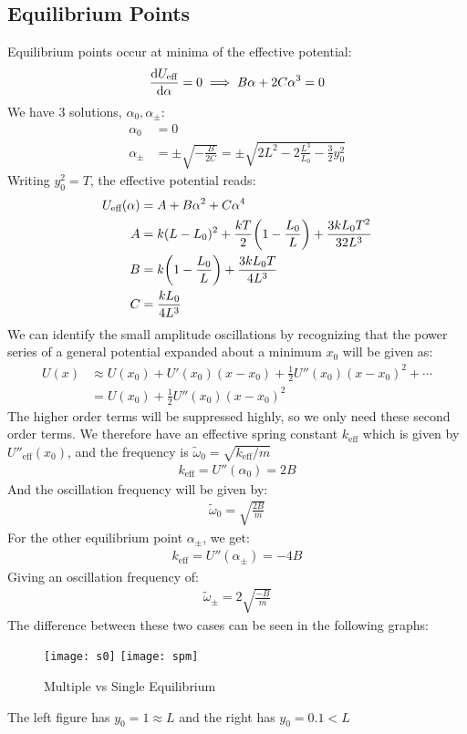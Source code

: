 \subsection{Equilibrium Points}
Equilibrium points occur at minima of the effective potential:
\begin{align*}
  \dv{U_{\text{eff}}}{\alpha}=0\implies B\alpha+2C\alpha^3=0
\end{align*}
We have 3 solutions, $\alpha_0,\alpha_\pm$:
\begin{align*}
  \alpha_0&=0\\
  \alpha_\pm&=\pm\sqrt{-\frac{B}{2C}}=
  \pm\sqrt{2L^2-2\frac{L^3}{L_0}-\frac32y_0^2}
\end{align*}
Writing $y_0^2=T$, the effective potential reads:
\begin{align*}
  U_{\text{eff}}(\alpha)&=A+B\alpha^2+C\alpha^4\\
  A&=k(L-L_0)^2+\frac{kT}2\qty(1-\frac{L_0}L)+\frac{3kL_0T^2}{32L^3}\\
  B&=k\qty(1-\frac{L_0}L)+\frac{3kL_0T}{4L^3}\\
  C&=\frac{kL_0}{4L^3}
\end{align*}
We can identify the small amplitude oscillations by recognizing that the power series of a general potential expanded about a minimum $x_0$ will be given as:
\begin{align*}
  U(x)&\approx U(x_0)+U'(x_0)(x-x_0)+\frac12U''(x_0)(x-x_0)^2+\cdots\\
  &=U(x_0)+\frac12U''(x_0)(x-x_0)^2
\end{align*}
The higher order terms will be suppressed highly, so we only need these second order terms. We therefore have an effective spring constant $k_{\text{eff}}$ which is given by $U''_{\text{eff}}(x_0)$, and the frequency is $\tilde{\omega}_0=\sqrt{k_{\text{eff}}/m}$
\begin{align*}
  k_{\text{eff}}=U''(\alpha_0)=2B
\end{align*}
And the oscillation frequency will be given by:
\begin{align}
  \boxed{\tilde{\omega}_0=\sqrt{\frac{2B}{m}}}
\end{align}
For the other equilibrium point $\alpha_\pm$, we get:
\begin{align*}
  k_{\text{eff}}=U''(\alpha_\pm)=-4B
\end{align*}
Giving an oscillation frequency of:
\begin{align*}
  \boxed{\tilde{\omega}_\pm=2\sqrt{\frac{-B}{m}}}
\end{align*}
The difference between these two cases can be seen in the following graphs:
\begin{figure}[H]
  \centering
  \texttt{[image: s0]}
  \texttt{[image: spm]}
  \caption{Multiple vs Single Equilibrium}
\end{figure}
The left figure has $y_0=1\approx L$ and the right has $y_0=0.1<L$
